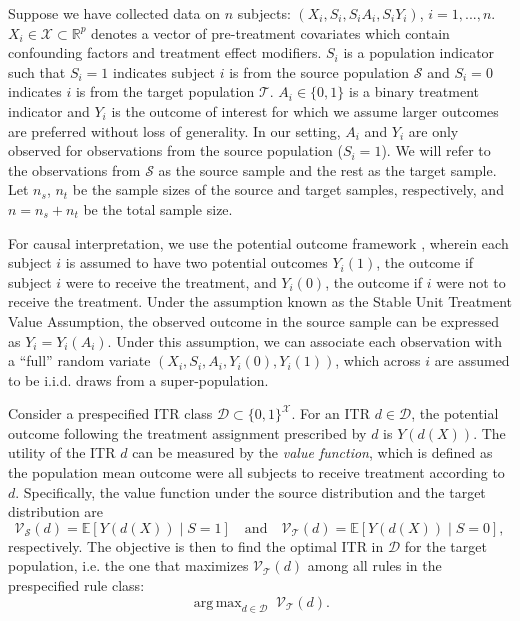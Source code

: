 \documentclass[12pt]{article}
\newcommand{\E}{\mathbb{E}}
\DeclareMathOperator*{\argmax}{arg\,max}
\begin{document}
Suppose we have collected data on $n$ subjects: $(X_i, S_i, S_i A_i, S_i Y_i)$, $i = 1, ..., n$. $X_i \in \mathcal{X} \subset \mathbb{R}^p$ denotes a vector of pre-treatment covariates which contain confounding factors and treatment effect modifiers. $S_i$ is a population indicator such that $S_i = 1$ indicates subject $i$ is from the source population $\mathcal{S}$ and $S_i = 0$ indicates $i$ is from the target population $\mathcal{T}$. $A_i \in\{0, 1\}$ is a binary treatment indicator and $Y_i$ is the outcome of interest for which we assume larger outcomes are preferred without loss of generality. In our setting, $A_i$ and $Y_i$ are only observed for observations from the source population ($S_i = 1$). We will refer to the observations from $\mathcal{S}$ as the source sample and the rest as the target sample. Let $n_s$, $n_t$ be the sample sizes of the source and target samples, respectively, and $n = n_s + n_t$ be the total sample size.

For causal interpretation, we use the potential outcome framework \citep{rubin1974estimating,rosenbaum1983central}, wherein each subject $i$ is assumed to have two potential outcomes  $Y_i(1)$, the outcome if subject $i$ were to receive the treatment, and $Y_i(0)$, the outcome if $i$ were not to receive the treatment. Under the assumption known as the Stable Unit Treatment Value Assumption, the observed outcome in the source sample can be expressed as $Y_i = Y_i(A_i)$. Under this assumption, we can associate each observation with a ``full'' random variate $(X_i, S_i, A_i, Y_i(0), Y_i(1))$, which across $i$ are assumed to be i.i.d. draws from a super-population.

Consider a prespecified ITR class $\mathcal{D} \subset \{0, 1\}^\mathcal{X}$. For an ITR $d \in \mathcal{D}$, the potential outcome following the treatment assignment prescribed by $d$ is $Y(d(X))$. The utility of the ITR $d$ can be measured by the \textit{value function}, which is defined as the population mean outcome were all subjects to receive treatment according to $d$. Specifically, the value function under the source distribution and the target distribution are
\begin{equation*}
    \mathcal{V}_\mathcal{S}(d) = \E[Y(d(X)) \mid S = 1]
    \quad\text{and}\quad
    \mathcal{V}_\mathcal{T}(d) = \E[Y(d(X)) \mid S = 0]
,\end{equation*}
respectively. The objective is then to find the optimal ITR in $\mathcal{D}$ for the target population, i.e. the one that maximizes $\mathcal{V}_\mathcal{T}(d)$ among all rules in the prespecified rule class:
\begin{equation}
    \label{eq:objective}
    \argmax_{d \in \mathcal{D}} \; \mathcal{V}_\mathcal{T}(d)
.\end{equation}
\end{document}
